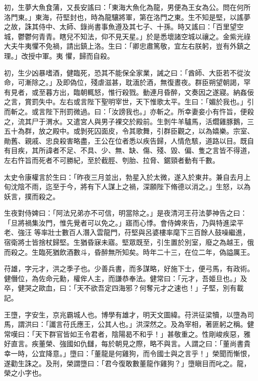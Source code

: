 \begin{pinyinscope}
 初，生夢大魚食蒲，又長安謠曰：「東海大魚化為龍，男便為王女為公。問在何所洛門東。」東海，苻堅封也，時為龍驤將軍，第在洛門之東。生不知是堅，以謠夢之故，誅其侍中、太師、錄尚書事魚遵及其七子、十孫。時又謠曰：「百里望空城，鬱鬱何青青。瞎兒不知法，仰不見天星。」於是悉壞諸空城以禳之。金紫光祿大夫牛夷懼不免禍，請出鎮上洛。生曰：「卿忠肅篤敬，宜左右朕躬，豈有外鎮之理。」改授中軍。夷
 懼，歸而自殺。



 初，生少凶暴嗜酒，健臨死，恐其不能保全家業，誡之曰：「酋師、大臣若不從汝命，可漸除之。」及即偽位，殘虐滋甚，耽湎於酒，無復晝夜。群臣朔望朝謁，罕有見者，或至暮方出，臨朝輒怒，惟行殺戮。動連月昏醉，文奏因之遂寢。納姦佞之言，賞罰失中。左右或言陛下聖明宰世，天下惟歌太平。生曰：「媚於我也。」引而斬之。或言陛下刑罰微過。曰：「汝謗我也。」亦斬之。所幸妻妾小有忤旨，便殺之，流其尸于渭水。又遣宮人與男子裸交於殿前。生剝牛羊驢馬，活爓雞豚鵝，三五十為群，放之殿中。或剝死囚面皮，令其歌舞，引群臣觀之，以為嬉樂。宗室、
 勛舊、親戚、忠良殺害略盡，王公在位者悉以疾告歸，人情危駭，道路以目。既自有目疾，其所諱者不足、不具、少、無、缺、傷、殘、毀、偏、隻之言皆不得道，左右忤旨而死者不可勝紀，至於截脛、刳胎、拉脅、鋸頸者動有千數。



 太史令康權言於生曰：「昨夜三月並出，勃星入於太微，遂入於東井。兼自去月上旬沈陰不雨，迄至于今，將有下人謀上之禍，深願陛下脩德以消之。」生怒，以為妖言，撲而殺之。



 生夜對侍婢曰：「阿法兄弟亦不可信，明當除之。」是夜清河王苻法夢神告之曰：「旦將禍集汝門，惟先覺者可以免之。」寤而心悸。會侍婢來告，乃與特進梁平老、強汪
 等率壯士數百人潛入雲龍門，苻堅與呂婆樓率麾下三百餘人鼓噪繼進，宿衛將士皆捨杖歸堅。生猶昏寐未寤。堅眾既至，引生置於別室，廢之為越王，俄而殺之。生臨死猶飲酒數斗，昏醉無所知矣。時年二十三，在位二年，偽謚厲王。



 苻雄，字元才，洪之季子也。少善兵書，而多謀略，好施下士，便弓馬，有政術。健僭位，為佐命元勳，權侔人主，而謙恭奉法。健常曰：「元才，吾姬旦也。」及卒，健哭之歐血，曰：「天不欲吾定四海邪？何奪元才之速也！」子堅，別有載記。



 王墮，字安生，京兆霸城人也。博學有雄才，明天文圖緯。苻洪征梁犢，以墮為司馬，謂洪曰：「讖言苻氏應王，公其人也。」洪深然之。及為宰相，著匪躬之稱。健常嘆曰：「天下群官皆如王令君者，陰陽曷不和乎！」甚敬重之。性剛峻疾惡，雅好直言。疾董榮、強國如仇讎，每於朝見之際，略不與言。人謂之曰：「董尚書貴幸一時，公宜降意。」墮曰：「董龍是何雞狗，而令國士與之言乎！」榮聞而慚恨，遂勸生誅之。及刑，榮謂墮曰：「君今復敢數董龍作雞狗？」墮瞋目而叱之。龍，榮之小字也。



\end{pinyinscope}